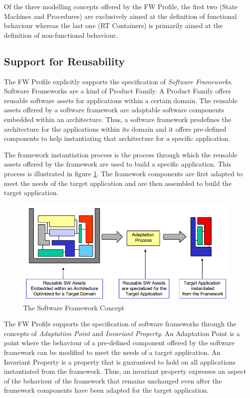 \documentclass[a4paper,10pt]{article}
\begin{document}
Of the three modelling concepts offered by the FW Profile, the first two (State Machines and Procedures) are exclusively aimed at the definition of functional behaviour whereas the last one (RT Containers) is primarily aimed at the definition of non-functional behaviour.

\subsection{Support for Reusability}\label{sec:supportForReusability} 
The FW Profile explicitly supports the specification of \textit{Software Frameworks}. Software
Frameworks are a kind of Product Family. A Product Family offers reusable software assets for
applications within a certain domain. The reusable assets offered by a software framework are
adaptable software components embedded within an architecture. Thus, a software
framework predefines the architecture for the applications within its domain and it offers pre-defined components to help instantiating that architecture for a specific application.

The framework instantiation process is the process through which the reusable assets offered by the framework are used to build a specific application. This process is illustrated in figure \ref{fig:SwFwConcept}. The framework components are first adapted to meet the needs of the target application and are then assembled to build the target application.

\begin{figure}[ht]
 \centering
 \includegraphics[scale=0.45,keepaspectratio=true]{../images/SwFrameworks.png}
 \caption{The Software Framework Concept}
 \label{fig:SwFwConcept}
\end{figure}

The FW Profile supports the specification of software frameworks through the concepts of \textit{Adaptation Point} and \textit{Invariant Property}. An Adaptation Point is a point where the behaviour of a pre-defined component offered by the software framework can be modified to meet the needs of a target application. An Invariant Property is a property that is guaranteed to hold on all applications instantiated from the framework. Thus, an invariant property expresses an aspect of the behaviour of the framework that remains unchanged even after the framework components have been adapted for the target application.
\end{document}
